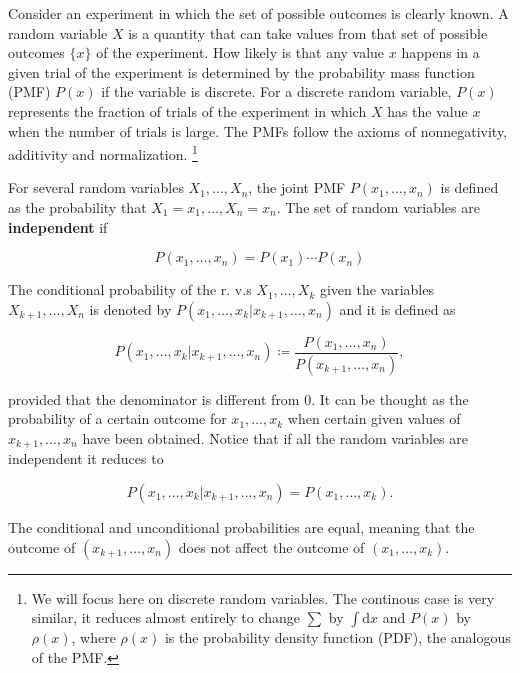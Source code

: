 Consider an experiment in which the set of possible outcomes is clearly known. A random variable $X$ is a quantity that can take values from that set of possible outcomes $\{x\}$ of the experiment. How likely is that any value $x$ happens in a given trial of the experiment is determined by the probability mass function (PMF) $P(x)$ if the variable is discrete. For a discrete random variable, $P(x)$ represents the fraction of trials of the experiment in which $X$ has the value $x$ when the number of trials is large. The PMFs follow the axioms of nonnegativity, additivity and normalization. \cite{bertsekas08} \footnote{We will focus here on discrete random variables. The continous case is very similar, it reduces almost entirely to change $\sum$ by $\int\mathrm{d}x$ and $P(x)$ by $\rho(x)$, where $\rho(x)$ is the probability density function (PDF), the analogous of the PMF.} 


For several random variables $X_1,\dotsc,X_n$, the joint PMF  $P(x_1,\dotsc,x_n)$ is defined as the probability that $X_1=x_1,\dotsc,X_n=x_n$. The set of random variables are \textbf{independent} if

\begin{equation*}
  P(x_1,\dotsc,x_n) = P(x_1)\dotsm P(x_n)
\end{equation*}

The conditional probability of the r. v.s $X_1,\dotsc,X_k$ given the variables $X_{k+1},\dotsc,X_n$ is denoted by $P(x_1,\dotsc,x_k|x_{k+1},\dotsc,x_n)$ and it is defined as

\begin{equation*}
  P(x_1,\dotsc,x_k|x_{k+1},\dotsc,x_n) \coloneqq \frac{P(x_1,\dotsc,x_n)}{P(x_{k+1},\dotsc,x_n)},
\end{equation*}

provided that the denominator is different from $0$. It can be thought as the probability of a certain outcome for $x_1,\dotsc,x_k$ when certain given values of $x_{k+1},\dotsc,x_n$ have been obtained. Notice that if all the random variables are independent it reduces to

\begin{equation*}
  P(x_1,\dotsc,x_k|x_{k+1},\dotsc,x_n) = P(x_1,\dotsc,x_k).
\end{equation*}

The conditional and unconditional probabilities are equal, meaning that the outcome of $(x_{k+1},\dotsc,x_n)$ does not affect the outcome of $(x_1,\dotsc,x_k)$.

